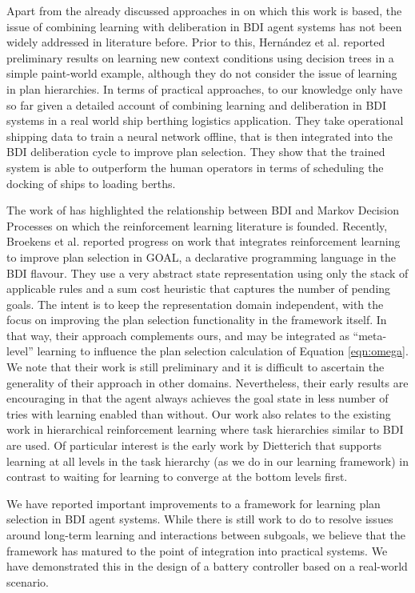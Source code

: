 Apart from the already discussed approaches in \cite{airiau09:enhancing,singh10:extending,singh10:learning} on which this work is based, the issue of combining learning with deliberation in BDI agent systems has not been widely addressed in literature before. 
%
Prior to this, Hern\'andez et al. \cite{hernandez04:learning} reported preliminary results on learning new context conditions using decision trees in a simple paint-world example, although they do not consider the issue of learning in plan hierarchies. In terms of practical approaches, to our knowledge only \cite{lokuge07:improving} have so far given a detailed account of combining learning and deliberation in BDI systems in a real world ship berthing logistics application. They take operational shipping data to train a neural network offline, that is then integrated into the BDI deliberation cycle to improve plan selection. They show that the trained system is able to outperform the human operators in terms of scheduling the docking of ships to loading berths.

The work of \cite{simari06:relationship} has highlighted the relationship between BDI and Markov Decision Processes on which the reinforcement learning literature is founded. 
%
Recently, Broekens et al. \cite{broekens10:reinforcement} reported progress on work that integrates reinforcement learning to improve plan selection in GOAL, a declarative programming language in the BDI flavour. They use a very abstract state representation using only the stack of applicable rules and a sum cost heuristic that captures the number of pending goals. The intent is to keep the representation domain independent, with the focus on improving the plan selection functionality in the framework itself. In that way, their approach complements ours, and may be integrated as ``meta-level'' learning to influence the plan selection calculation of Equation \ref{eqn:omega}. We note that their work is still preliminary and it is difficult to ascertain the generality of their approach in other domains. Nevertheless, their early results are encouraging in that the agent always achieves the goal state in less number of tries with learning enabled than without.
%
Our work also relates to the existing work in hierarchical reinforcement learning \cite{barto03:recent} where task hierarchies similar to BDI are used. Of particular interest is the early work by Dietterich \cite{dietterich00:hierarchical} that supports learning at all levels in the task hierarchy (as we do in our learning framework) in contrast to waiting for learning to converge at the bottom levels first.

We have reported important improvements to a framework for learning plan selection in BDI agent systems. While there is still work to do to resolve issues around long-term learning and interactions between subgoals, we believe that the framework has matured to the point of integration into practical systems. We have demonstrated this in the design of a battery controller based on a real-world scenario.




